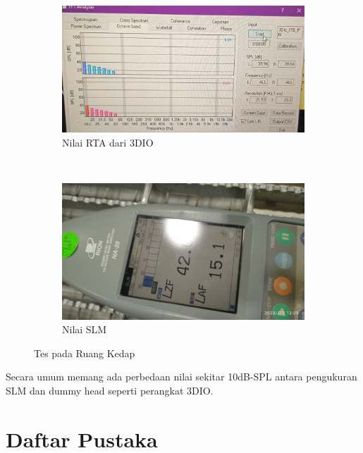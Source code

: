 \documentclass{article}
\begin{document}
	\begin{figure}[H]
		\centering
		\begin{subfigure}[]{.45\textwidth}
			\includegraphics[width=\textwidth]{images/tes_kedap_rta}
			\caption{Nilai RTA dari 3DIO}
		\end{subfigure}
		\\
		\begin{subfigure}[]{.45\textwidth}
			\includegraphics[width=\textwidth]{images/tes_kedap_slm}
			\caption{Nilai SLM}
		\end{subfigure}
		\caption{Tes pada Ruang Kedap}
	\end{figure}

	Secara umum memang ada perbedaan nilai sekitar 10dB-SPL antara pengukuran SLM dan dummy head seperti perangkat 3DIO\cite{Sudarsono2018}.
	
	\newpage
	\section{Daftar Pustaka}
	
	
	
\end{document}

